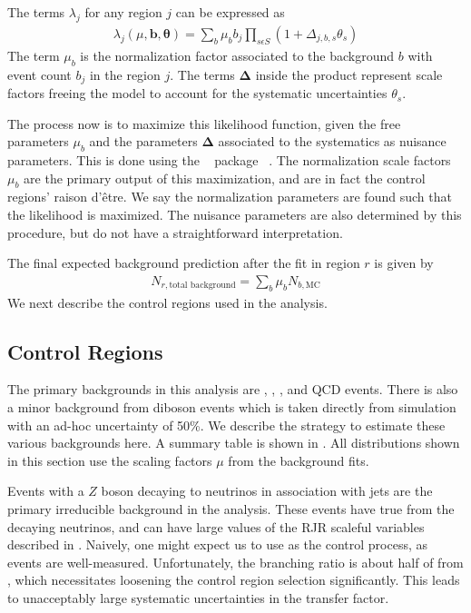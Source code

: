 The terms $\lambda_j$ for any region $j$ can be expressed as
\begin{align}
\lambda_j( \mu, \bm{b},\bm{\theta}) = \sum_b \mu_b \xspace b_j \xspace \prod_{s\epsilon S} \xspace (1 + \Delta_{j,b,s} \theta_s)
\end{align}
The term $\mu_b$ is the normalization factor associated to the background $b$ with event count $b_j$ in the region $j$.
The terms $\bm{\Delta}$ inside the product represent scale factors freeing the model to account for the systematic uncertainties $\theta_s$.

The process now is to maximize this likelihood function, given the free parameters $\mu_b$ and the parameters $\bm{\Delta}$ associated to the systematics as nuisance parameters.
This is done using the \histfitter~ package ~\cite{Baak:2014wma}.
The normalization scale factors $\mu_b$ are the primary output of this maximization, and are in fact the control regions' raison d'\^{e}tre.
We say the normalization parameters are found such that the likelihood is maximized.
The nuisance parameters are also determined by this procedure, but do not have a straightforward interpretation.

The final expected background prediction after the fit in region $r$ is given by
\begin{align}
N_{r,\text{total background}} = \sum_b \mu_b N_{b, \text{MC}}
\end{align}
We next describe the control regions used in the analysis.

\subsection{Control Regions}

The primary backgrounds in this analysis are \zjets, \wjets, \ttbar, and QCD events.
There is also a minor background from diboson events which is taken directly from simulation with an ad-hoc uncertainty of 50\%.
We describe the strategy to estimate these various backgrounds here.
A summary table is shown in .
All distributions shown in this section use the scaling factors $\mu$ from the background fits.


Events with a $Z$ boson decaying to neutrinos in association with jets are the primary irreducible background in the analysis.
These events have true \met from the decaying neutrinos, and can have large values of the RJR scaleful variables described in .
Naively, one might expect us to use \Zll as the control process, as \Zll events are well-measured.
Unfortunately, the \Zll branching ratio is about half of from \Zvv, which necessitates loosening the control region selection significantly.
This leads to unacceptably large systematic uncertainties in the transfer factor.


